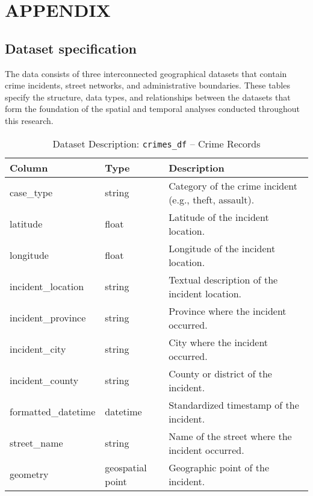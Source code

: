 \chapter*{\center \Large APPENDIX} 

\appendix
\renewcommand{\thesection}{A.\arabic{section}}
\section{Dataset specification}
\label{appendix:dataset}

The data consists of three interconnected geographical datasets that contain crime incidents, street networks, and administrative boundaries. These tables specify the structure, data types, and relationships between the datasets that form the foundation of the spatial and temporal analyses conducted throughout this research.

\begin{table}[H]
\centering
\scriptsize
\begin{tabular}{|l|l|p{8cm}|}
  \hline
\textbf{Column} & \textbf{Type} & \textbf{Description} \\
\hline
case\_type & string & Category of the crime incident (e.g., theft, assault). \\
latitude & float & Latitude of the incident location. \\
longitude & float & Longitude of the incident location. \\
incident\_location & string & Textual description of the incident location. \\
incident\_province & string & Province where the incident occurred. \\
incident\_city & string & City where the incident occurred. \\
incident\_county & string & County or district of the incident. \\
formatted\_datetime & datetime & Standardized timestamp of the incident. \\
street\_name & string & Name of the street where the incident occurred. \\
geometry & geospatial point & Geographic point of the incident. \\
\hline
\end{tabular}
\caption{Dataset Description: \texttt{crimes\_df} – Crime Records}
\end{table}


